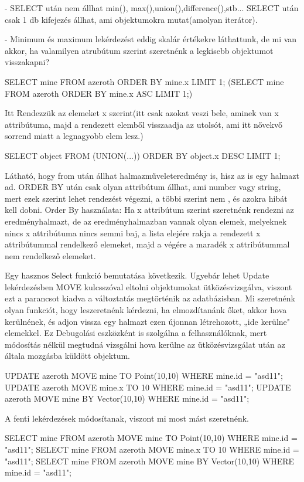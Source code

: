 \begin{sql}
- SELECT után nem állhat min(), max(),union(),difference(),stb...
SELECT után csak 1 db kifejezés állhat, ami objektumokra mutat(amolyan iterátor).

- Minimum és maximum lekérdezést eddig skalár értékekre láthattunk, de mi van akkor, ha valamilyen atrubútum szerint szeretnénk a legkisebb objektumot visszakapni?

\begin{sql}
SELECT mine FROM azeroth ORDER BY mine.x LIMIT 1;
(SELECT mine FROM azeroth ORDER BY mine.x ASC LIMIT 1;)
\end{sql}
Itt Rendezzük az elemeket x szerint(itt csak azokat veszi bele, aminek van x attribútuma, majd a rendezett elemből visszaadja az utolsót, ami itt nővekvő sorrend miatt a legnagyobb elem lesz.)

\begin{sql}
SELECT object FROM (UNION(...)) ORDER BY object.x DESC LIMIT 1;
\end{sql}
Látható, hogy from után állhat halmazműveleteredmény is, hisz az is egy halmazt ad. ORDER BY után csak olyan attribútum állhat, ami number vagy string, mert ezek szerint lehet rendezést végezni, a többi szerint nem , és azokra hibát kell dobni.
Order By használata: Ha x attribútum szerint szeretnénk rendezni az eredményhalmazt, de az eredményhalmazban vannak olyan elemek, melyeknek nincs x attribútuma nincs semmi baj, a lista elejére rakja a rendezett x attribútummal rendelkező elemeket, majd a végére a maradék x attribútummal nem rendelkező elemeket. 

Egy hasznos Select funkció bemutatása következik. Ugyebár lehet Update lekérdezésben MOVE kulcsszóval eltolni objektumokat ütközésvizsgálva, viszont ezt a parancsot kiadva a változtatás megtörténik az adatbázisban.
Mi szeretnénk olyan funkciót, hogy leszeretnénk kérdezni, ha elmozdítanánk őket, akkor hova kerülnének, és adjon vissza egy halmazt ezen újonnan létrehozott, „ide kerülne" elemekkel. Ez Debugolási eszközként is szolgálna a felhasználóknak, mert módosítás nélkül megtudná vizsgálni hova kerülne az ütközésvizsgálat után az általa mozgásba küldött objektum.
\begin{sql}
UPDATE azeroth MOVE  mine TO  Point(10,10) WHERE mine.id = "asd11"; 
UPDATE azeroth MOVE  mine.x TO 10 WHERE mine.id = "asd11"; 
UPDATE azeroth MOVE  mine BY  Vector(10,10) WHERE mine.id = "asd11"; 
\end{sql}
A fenti lekérdezések módosítanak, viszont mi most mást szeretnénk.

\begin{sql}
SELECT mine FROM azeroth MOVE  mine TO  Point(10,10) WHERE mine.id = "asd11"; 
SELECT mine FROM azeroth MOVE  mine.x TO 10 WHERE mine.id = "asd11"; 
SELECT mine FROM azeroth MOVE  mine BY  Vector(10,10) WHERE mine.id = "asd11";
\end{sql}


\end{sql}
